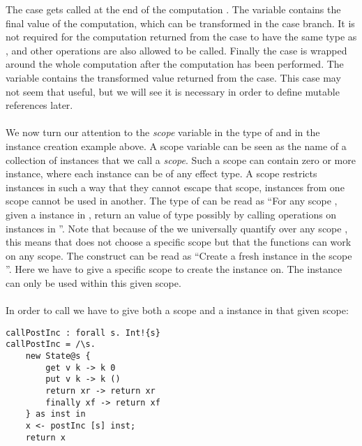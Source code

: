 The  case gets called at the end of the computation .
The variable  contains the final value of the computation, which can be transformed in the case branch.
It is not required for the computation returned from the case to have the same type as , and other operations are also allowed to be called.
Finally the  case is wrapped around the whole computation  after the  computation has been performed.
The variable  contains the transformed value returned from the  case.
This case may not seem that useful, but we will see it is necessary in order to define mutable references later.
\\\\
We now turn our attention to the \emph{scope} variable  in the type of  and in the instance creation example above.
A scope variable can be seen as the name of a collection of instances that we call a \emph{scope}.
Such a scope can contain zero or more instance, where each instance can be of any effect type.
A scope restricts instances in such a way that they cannot escape that scope, instances from one scope cannot be used in another.
The type of  can be read as ``For any scope , given a  instance in , return an value of type  possibly by calling operations on instances in ''. Note that because of the  we universally quantify over any scope , this means that  does not choose a specific scope but that the functions can work on any scope. The construct  can be read as ``Create a fresh  instance in the scope ''. Here we have to give a specific scope  to create the instance on. The instance can only be used within this given scope.
\\\\
In order to call  we have to give both a scope and a  instance in that given scope:
\begin{verbatim}
callPostInc : forall s. Int!{s}
callPostInc = /\s.
	new State@s {
		get v k -> k 0
		put v k -> k ()
		return xr -> return xr
		finally xf -> return xf
	} as inst in
	x <- postInc [s] inst;
	return x
\end{verbatim}

